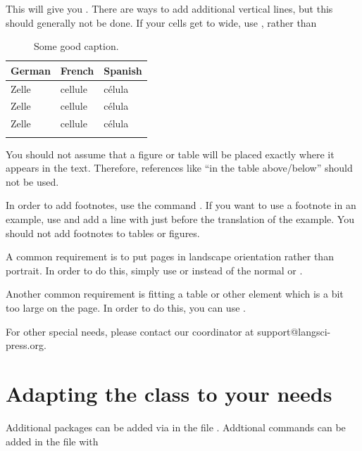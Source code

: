This will give you  . There are ways to add additional vertical lines, but this should generally not be done. If your cells get to wide, use , rather than 
\begin{table}[h]
  \begin{tabular}{lll}
    \lsptoprule
    German  & French  & Spanish \\
    \midrule
    Zelle   & cellule & célula    \\
    Zelle   & cellule & célula    \\
    Zelle   & cellule & célula    \\
    \lspbottomrule
  \end{tabular}
  \caption{Some good caption.}
  \label{tab:chapterhandle:keytotable}
\end{table}

You should not assume that a figure or table will be placed exactly where it appears in the text. Therefore, references like ``in the table above/below'' should not be used. 

In order to add footnotes, use the command . If you want to use a footnote in an example, use  and add a line with  just before the translation of the example. You should not add footnotes to tables or figures.


A common requirement is to put pages in landscape orientation rather than portrait. In order to do this, simply use  or  instead of the normal  or .

Another common requirement is fitting a table or other element which is a bit too large on the page. In order to do this, you can use .

For other special needs, please contact our coordinator at support@langsci-press.org. 
\section{Adapting the class to your needs}

Additional packages can be added via  in the file .
Addtional commands can be added in the file  with 



